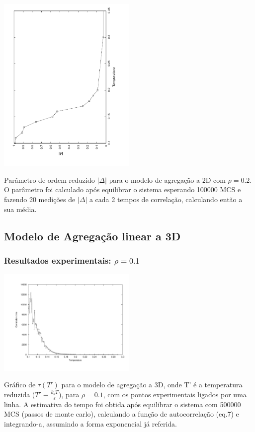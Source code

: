 \documentclass[a4paper,10pt]{article}
\makeatletter
\newenvironment{figurehere}
  {\def\@captype{figure}}
  {}
\makeatother
\begin{document}
\begin{multicols}{2}
\begin{figurehere}
	\centering
		\includegraphics[angle=-90, width=0.5\textwidth]{images/delta2d}
	\caption{{\footnotesize Parâmetro de ordem reduzido $|\Delta|$ para o modelo de agregação a 2D com $\rho = 0.2$. O parâmetro foi calculado após equilibrar o sistema esperando 100000 MCS e fazendo 20 medições de $|\Delta|$ a cada 2 tempos de correlação, calculando então a sua média.}}
	\label{fig:6}
\end{figurehere}

\subsection{Modelo de Agregação linear a 3D}
\subsubsection{Resultados experimentais: $\rho=0.1$}

\begin{figurehere}
	\centering
		\includegraphics[width=0.5\textwidth, clip, trim = 1.7cm 1.5cm 1cm 1cm]{images/ctimes1}
	\caption{{\footnotesize Gráfico de $\tau(T')$ para o modelo de agregação a 3D, onde T' é a temperatura reduzida ($T'\equiv\frac{k_b T}{\varepsilon}$), para $\rho = 0.1$, com os pontos experimentais ligados por uma linha. A estimativa do tempo foi obtida após equilibrar o sistema com 500000 MCS (passos de monte carlo), calculando a função de autocorrelação (eq.7) e integrando-a, assumindo a forma exponencial já referida.}}
	\label{fig:7}
\end{figurehere}


\end{multicols}
\end{document}
